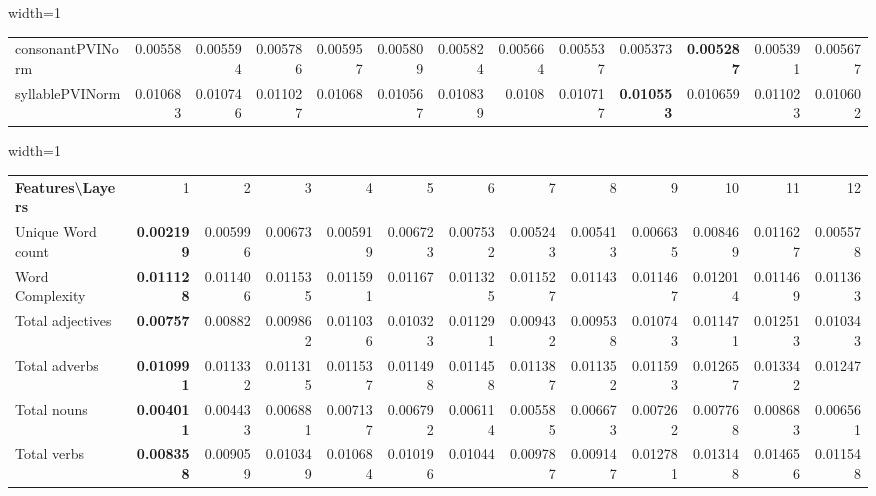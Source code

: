 \documentclass[sigconf]{acmart}
\newcommand{\mj}{Mockingjay\xspace}
\begin{document}
\begin{table*}[]
\begin{adjustbox}{width=1\textwidth}
\begin{tabular}{@{}l|rrrrrrrrrrrr@{}}
consonantPVINorm & 0.00558 & 0.005594 & 0.005786 & 0.005957 & 0.005809 & 0.005824 & 0.005664 & 0.005537 & 0.005373 & \textbf{0.005287} & 0.005391 & 0.005677 \\
syllablePVINorm & 0.010683 & 0.010746 & 0.011027 & 0.01068 & 0.010567 & 0.010839 & 0.0108 & 0.010717 & \textbf{0.010553} & 0.010659 & 0.011023 & 0.010602
\\ \bottomrule
\end{tabular}
\end{adjustbox}
\vspace{1 mm}
\caption{\label{Pron_M}  \small Results (MSE) for pronunciation features on {\mj} for native read speech corpus (Librispeech)}

\end{table*}

\begin{table*}[]
\begin{adjustbox}{width=1\textwidth}
\begin{tabular}{@{}l|rrrrrrrrrrrr@{}}
\toprule
\textbf{Features\textbackslash{}Layers} & 1                 & 2                 & 3                & 4        & 5        & 6        & 7        & 8        & 9        & 10       & 11       & 12       \\
Unique Word count                       & \textbf{0.002199} & 0.005996          & 0.00673          & 0.005919 & 0.006723 & 0.007532 & 0.005243 & 0.005413 & 0.006635 & 0.008469 & 0.011627 & 0.005578 \\
Word Complexity                         & \textbf{0.011128} & 0.011406          & 0.011535         & 0.011591 & 0.01167  & 0.011325 & 0.011527 & 0.01143  & 0.011467 & 0.012014 & 0.011469 & 0.011363 \\
Total adjectives                        & \textbf{0.00757}  & 0.00882           & 0.009862         & 0.011036 & 0.010323 & 0.011291 & 0.009432 & 0.009538 & 0.010743 & 0.011471 & 0.012513 & 0.010343 \\
Total adverbs                           & \textbf{0.010991} & 0.011332          & 0.011315         & 0.011537 & 0.011498 & 0.011458 & 0.011387 & 0.011352 & 0.011593 & 0.012657 & 0.013342 & 0.01247  \\
Total nouns                             & \textbf{0.004011} & 0.004433          & 0.006881         & 0.007137 & 0.006792 & 0.006114 & 0.005585 & 0.006673 & 0.007262 & 0.007768 & 0.008683 & 0.006561 \\
Total verbs                             & \textbf{0.008358} & 0.009059          & 0.010349         & 0.010684 & 0.010196 & 0.01044  & 0.009787 & 0.009147 & 0.012781 & 0.013148 & 0.014656 & 0.011548 \\

\end{tabular}
\end{adjustbox}
\end{table*}
\end{document}
